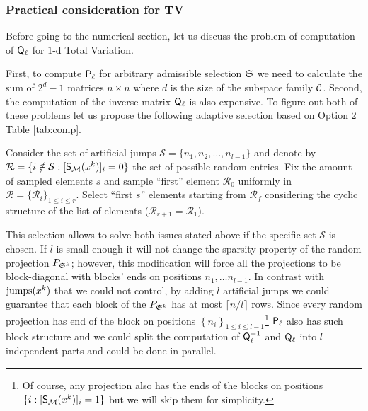 \subsubsection{Practical consideration for TV}
{
Before going to the numerical section, let us discuss the problem of computation of ${\mathsf{Q}}_\ell$ for $1$-d Total Variation.

First, to compute ${\mathsf{P}}_\ell$ for arbitrary admissible selection $\mathfrak{S}$ we need to calculate the sum of $2^d - 1$ matrices $n\times n$ where $d$ is the size of the subspace family $\mathcal{C}$. Second, the computation of the inverse matrix ${\mathsf{Q}}_\ell$ is also expensive. To figure out both of these problems let us propose the following adaptive selection based on Option $2$ Table \ref{tab:comp}.

Consider the set of artificial jumps  $\mathcal{S} = \{n_1, n_2, \ldots, n_{l-1}\}$ and denote by $\mathcal{R} = \{i\notin \mathcal{S}: [\mathsf{S}_{\mathcal{M}}(x^k)]_i=0\}$ the set of possible random entries. Fix the amount of sampled elements $s$ and sample ``first'' element $\mathcal{R}_0$ uniformly in $\mathcal{R} = \{\mathcal{R}_i\}_{1\leq i\leq r}$. Select ``first $s$'' elements starting from $\mathcal{R}_f$ considering the cyclic structure of the list of elements ($\mathcal{R}_{r+1} = \mathcal{R}_1$). 

This selection allows to solve both issues stated above if the specific set $\mathcal{S}$ is chosen. If $l$ is small enough it will not change the sparsity property of the random projection $P_{\mathfrak{S}^k}$; however, this modification will force all the projections to be block-diagonal with blocks' ends on positions $n_1,\ldots n_{l-1}$. In contrast with $\mathrm{jumps}(x^k)$ that we could not control, by adding $l$ artificial jumps we could guarantee that each block of the $P_{\mathfrak{S}^k}$ has at most $\lceil n/l\rceil$ rows. Since every random projection has end of the block on positions $\left\{n_i\right\}_{1\leq i \leq l -1}$\footnote{Of course, any projection also has the ends of the blocks on positions $\{i:[\mathsf{S}_{\mathcal{M}}(x^k)]_i = 1\}$ but we will skip them for simplicity.} ${\mathsf{P}}_\ell$ also has such block structure and we could split the computation of ${\mathsf{Q}}_\ell^{-1}$ and ${\mathsf{Q}}_\ell$ into $l$ independent parts and could be done in parallel.

}
